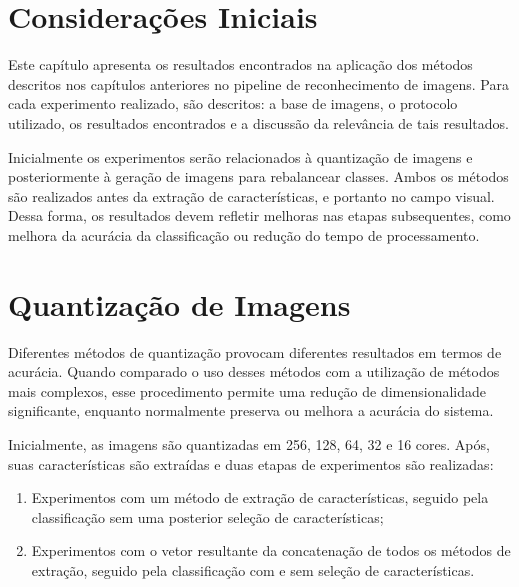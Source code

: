 %

\section{Considerações Iniciais}

Este capítulo apresenta os resultados encontrados na aplicação dos métodos descritos nos capítulos anteriores no pipeline de reconhecimento de imagens. Para cada experimento realizado, são descritos: a base de imagens, o protocolo utilizado, os resultados encontrados e a discussão da relevância de tais resultados.

Inicialmente os experimentos serão relacionados à quantização de imagens e posteriormente à geração de imagens para rebalancear classes. Ambos os métodos são realizados antes da extração de características, e portanto no campo visual. Dessa forma, os resultados devem refletir melhoras nas etapas subsequentes, como melhora da acurácia da classificação ou redução do tempo de processamento.

\section{Quantização de Imagens}

Diferentes métodos de quantização provocam diferentes resultados em termos de acurácia. Quando comparado o uso desses métodos com a utilização de métodos mais complexos, esse procedimento permite uma redução de dimensionalidade significante, enquanto normalmente preserva ou melhora a acurácia do sistema.

Inicialmente, as imagens são quantizadas em 256, 128, 64, 32 e 16 cores. Após, suas características são extraídas e duas etapas de experimentos são realizadas:
\begin{enumerate}
  \item Experimentos com um método de extração de características, seguido pela classificação sem uma posterior seleção de características;
  \item Experimentos com o vetor resultante da concatenação de todos os métodos de extração, seguido pela classificação com e sem seleção de características.
\end{enumerate}

